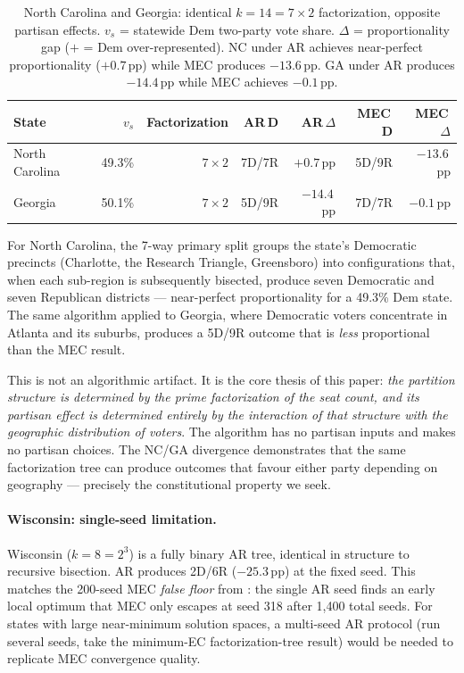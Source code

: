 \begin{table}[h]
\centering
\begin{tabular}{lrrrrrr}
\toprule
State & $v_s$ & Factorization & AR\,D & AR\,$\Delta$ & MEC\,D & MEC\,$\Delta$ \\
\midrule
North Carolina & 49.3\% & $7\times 2$ & 7D/7R & $+0.7$\,pp & 5D/9R & $-13.6$\,pp \\
Georgia        & 50.1\% & $7\times 2$ & 5D/9R & $-14.4$\,pp & 7D/7R & $-0.1$\,pp \\
\bottomrule
\end{tabular}
\caption{North Carolina and Georgia: identical $k=14=7\times 2$ factorization,
  opposite partisan effects. $v_s$ = statewide Dem two-party vote share.
  $\Delta$ = proportionality gap ($+$ = Dem over-represented).
  NC under AR achieves near-perfect proportionality ($+0.7$\,pp) while MEC
  produces $-13.6$\,pp. GA under AR produces $-14.4$\,pp while MEC achieves
  $-0.1$\,pp.}
\label{tab:nc-ga}
\end{table}

For North Carolina, the 7-way primary split groups the state's Democratic
precincts (Charlotte, the Research Triangle, Greensboro) into configurations
that, when each sub-region is subsequently bisected, produce seven Democratic
and seven Republican districts --- near-perfect proportionality for a 49.3\%
Dem state. The same algorithm applied to Georgia, where Democratic voters
concentrate in Atlanta and its suburbs, produces a 5D/9R outcome that is
\emph{less} proportional than the MEC result.

This is not an algorithmic artifact. It is the core thesis of this paper:
\emph{the partition structure is determined by the prime factorization of the
seat count, and its partisan effect is determined entirely by the interaction of
that structure with the geographic distribution of voters}. The algorithm has no
partisan inputs and makes no partisan choices. The NC/GA divergence demonstrates
that the same factorization tree can produce outcomes that favour either party
depending on geography --- precisely the constitutional property we seek.

\paragraph{Wisconsin: single-seed limitation.}
Wisconsin ($k = 8 = 2^3$) is a fully binary AR tree, identical in structure
to recursive bisection. AR produces 2D/6R ($-25.3$\,pp) at the fixed seed.
This matches the 200-seed MEC \emph{false floor} from \citet{dellaLibera2026mec}:
the single AR seed finds an early local optimum that MEC only escapes at seed
318 after 1{,}400 total seeds. For states with large near-minimum solution
spaces, a multi-seed AR protocol (run several seeds, take the minimum-EC
factorization-tree result) would be needed to replicate MEC convergence quality.


